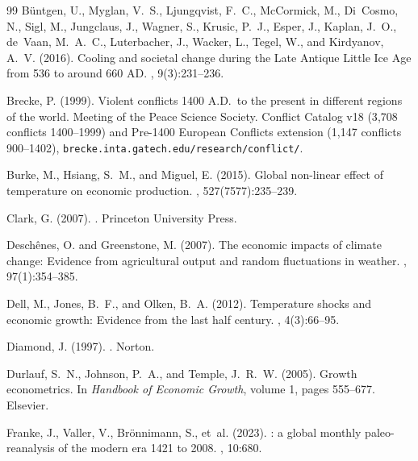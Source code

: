 \documentclass[11pt,letterpaper]{article}
\begin{document}
\begin{thebibliography}{99}
B\"untgen, U., Myglan, V.~S., Ljungqvist, F.~C., McCormick, M., Di~Cosmo, N., Sigl, M., Jungclaus, J., Wagner, S., Krusic, P.~J., Esper, J., Kaplan, J.~O., de~Vaan, M.~A.~C., Luterbacher, J., Wacker, L., Tegel, W., and Kirdyanov, A.~V. (2016).
\newblock Cooling and societal change during the {Late Antique Little Ice Age} from 536 to around 660 {AD}.
, 9(3):231--236.

Brecke, P. (1999).
\newblock Violent conflicts 1400 A.D.\ to the present in different regions of the world.
 Meeting of the Peace Science Society.
\newblock Conflict Catalog v18 (3{,}708 conflicts 1400--1999) and Pre-1400 European Conflicts extension (1{,}147 conflicts 900--1402),
  \texttt{brecke.inta.gatech.edu/research/conflict/}.

Burke, M., Hsiang, S.~M., and Miguel, E. (2015).
\newblock Global non-linear effect of temperature on economic production.
, 527(7577):235--239.

Clark, G. (2007).
.
\newblock Princeton University Press.

Deschênes, O. and Greenstone, M. (2007).
\newblock The economic impacts of climate change: Evidence from agricultural output and random fluctuations in weather.
, 97(1):354--385.

Dell, M., Jones, B.~F., and Olken, B.~A. (2012).
\newblock Temperature shocks and economic growth: Evidence from the last half century.
, 4(3):66--95.

Diamond, J. (1997).
.
\newblock Norton.

Durlauf, S.~N., Johnson, P.~A., and Temple, J.~R.~W. (2005).
\newblock Growth econometrics.
\newblock In \emph{Handbook of Economic Growth}, volume 1, pages 555--677. Elsevier.

Franke, J., Valler, V., Brönnimann, S., et~al. (2023).
: a global monthly paleo-reanalysis of the modern era 1421 to 2008.
, 10:680.


\end{thebibliography}
\end{document}
